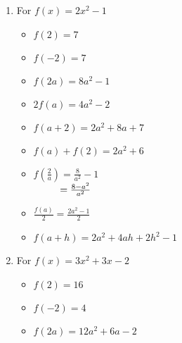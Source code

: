 \begin{enumerate}
\item For $f(x) = 2x^2-1$

\begin{multicols}{3}
\begin{itemize}

\item  $f(2) = 7$
\item  $f(-2) = 7$
\item  $f(2a) = 8a^2-1$

\end{itemize}
\end{multicols}

\begin{multicols}{3}
\begin{itemize}

\item  $2 f(a) = 4a^2-2$
\item $f(a+2) = 2a^2+8a+7$
\item $f(a) + f(2) = 2a^2+6$

\end{itemize}
\end{multicols}

\begin{multicols}{3}
\begin{itemize}

\item  $f \left( \frac{2}{a} \right) = \frac{8}{a^2} - 1$ \\
$\hphantom{f \left( \frac{2}{a} \right)} = \frac{8-a^2}{a^2}$

\vfill

\columnbreak

\item $\frac{f(a)}{2} =  \frac{2a^2-1}{2}$

\vfill

\columnbreak


\item  $f(a + h) = 2a^2+4ah+2h^2-1$

\end{itemize}
\end{multicols}

\pagebreak

\item For $f(x) = 3x^2+3x-2$

\begin{multicols}{3}
\begin{itemize}

\item  $f(2) = 16$
\item  $f(-2) = 4$
\item  $f(2a) = 12a^2+6a-2$


\end{itemize}
\end{multicols}
\end{enumerate}

